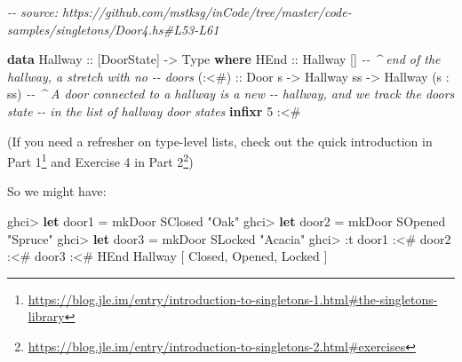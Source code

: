 \documentclass[]{article}
\newenvironment{Shaded}{}{}
\newcommand{\CommentTok}[1]{\textcolor[rgb]{0.38,0.63,0.69}{\textit{#1}}}
\newcommand{\DataTypeTok}[1]{\textcolor[rgb]{0.56,0.13,0.00}{#1}}
\newcommand{\DecValTok}[1]{\textcolor[rgb]{0.25,0.63,0.44}{#1}}
\newcommand{\KeywordTok}[1]{\textcolor[rgb]{0.00,0.44,0.13}{\textbf{#1}}}
\newcommand{\NormalTok}[1]{#1}
\newcommand{\OperatorTok}[1]{\textcolor[rgb]{0.40,0.40,0.40}{#1}}
\newcommand{\OtherTok}[1]{\textcolor[rgb]{0.00,0.44,0.13}{#1}}
\newcommand{\StringTok}[1]{\textcolor[rgb]{0.25,0.44,0.63}{#1}}
\renewcommand{\href}[2]{#2\footnote{\url{#1}}}
\begin{document}
\begin{Shaded}
\begin{Highlighting}[]
\CommentTok{{-}{-} source: https://github.com/mstksg/inCode/tree/master/code{-}samples/singletons/Door4.hs\#L53{-}L61}

\KeywordTok{data} \DataTypeTok{Hallway}\OtherTok{ ::}\NormalTok{ [}\DataTypeTok{DoorState}\NormalTok{] }\OtherTok{{-}>} \DataTypeTok{Type} \KeywordTok{where}
    \DataTypeTok{HEnd}\OtherTok{  ::} \DataTypeTok{Hallway}\NormalTok{ \textquotesingle{}[]        }\CommentTok{{-}{-} \^{} end of the hallway, a stretch with no}
                                \CommentTok{{-}{-}   doors}
\OtherTok{    (:<\#) ::} \DataTypeTok{Door}\NormalTok{ s}
          \OtherTok{{-}>} \DataTypeTok{Hallway}\NormalTok{ ss}
          \OtherTok{{-}>} \DataTypeTok{Hallway}\NormalTok{ (s \textquotesingle{}}\OperatorTok{:}\NormalTok{ ss)  }\CommentTok{{-}{-} \^{} A door connected to a hallway is a new}
                                \CommentTok{{-}{-}   hallway, and we track the door\textquotesingle{}s state}
                                \CommentTok{{-}{-}   in the list of hallway door states}
\KeywordTok{infixr} \DecValTok{5} \OperatorTok{:<\#}
\end{Highlighting}
\end{Shaded}

(If you need a refresher on type-level lists, check out
\href{https://blog.jle.im/entry/introduction-to-singletons-1.html\#the-singletons-library}{the
quick introduction in Part 1} and
\href{https://blog.jle.im/entry/introduction-to-singletons-2.html\#exercises}{Exercise
4 in Part 2})

So we might have:

\begin{Shaded}
\begin{Highlighting}[]
\NormalTok{ghci}\OperatorTok{>} \KeywordTok{let}\NormalTok{ door1 }\OtherTok{=}\NormalTok{ mkDoor }\DataTypeTok{SClosed} \StringTok{"Oak"}
\NormalTok{ghci}\OperatorTok{>} \KeywordTok{let}\NormalTok{ door2 }\OtherTok{=}\NormalTok{ mkDoor }\DataTypeTok{SOpened} \StringTok{"Spruce"}
\NormalTok{ghci}\OperatorTok{>} \KeywordTok{let}\NormalTok{ door3 }\OtherTok{=}\NormalTok{ mkDoor }\DataTypeTok{SLocked} \StringTok{"Acacia"}
\NormalTok{ghci}\OperatorTok{>} \OperatorTok{:}\NormalTok{t door1 }\OperatorTok{:<\#}\NormalTok{ door2 }\OperatorTok{:<\#}\NormalTok{ door3 }\OperatorTok{:<\#} \DataTypeTok{HEnd}
\DataTypeTok{Hallway}\NormalTok{ \textquotesingle{}[ }\DataTypeTok{\textquotesingle{}Closed}\NormalTok{, }\DataTypeTok{\textquotesingle{}Opened}\NormalTok{, }\DataTypeTok{\textquotesingle{}Locked}\NormalTok{ ]}
\end{Highlighting}
\end{Shaded}
\end{document}

